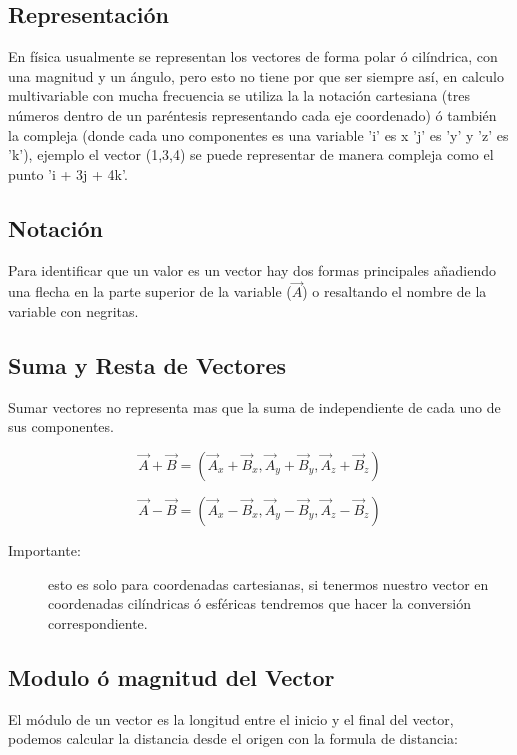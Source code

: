 \documentclass{article}
\begin{document}
\subsection{Representación}
\label{sec:org7eb2aeb}
En física usualmente se representan los vectores de forma polar ó cilíndrica, con una magnitud y un ángulo, pero esto no tiene por que ser siempre así, en calculo multivariable con mucha frecuencia se utiliza la la notación cartesiana (tres números dentro de un paréntesis representando cada eje coordenado) ó también la compleja (donde cada uno componentes es una variable 'i' es x 'j' es 'y' y 'z' es 'k'), ejemplo el vector (1,3,4) se puede representar de manera compleja como el punto 'i + 3j + 4k'. 

\subsection{Notación}
\label{sec:org51f659c}
Para identificar que un valor es un vector hay dos formas principales añadiendo una flecha en la parte superior de la variable (\(\vec{A}\)) o resaltando el nombre de la variable con negritas. 

\subsection{Suma y Resta de Vectores}
\label{sec:org843534e}
Sumar vectores no representa mas que la suma de independiente de cada uno de sus componentes.

\[
\vec{A} + \vec{B} = (\vec{A}_x + \vec{B}_x,\vec{A}_y + \vec{B}_y,\vec{A}_z + \vec{B}_z)
\]

\[
\vec{A} - \vec{B} = (\vec{A}_x - \vec{B}_x,\vec{A}_y - \vec{B}_y,\vec{A}_z - \vec{B}_z)
\]

\begin{description}
\item[{Importante:}] esto es solo para coordenadas cartesianas, si tenermos nuestro vector en coordenadas cilíndricas ó esféricas tendremos que hacer la conversión correspondiente.
\end{description}

\subsection{Modulo ó magnitud del Vector}
\label{sec:org1dbbd0e}
El módulo de un vector es la longitud entre el inicio y el final del vector, podemos calcular la distancia desde el origen con la formula de distancia:
\end{document}
